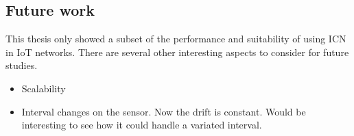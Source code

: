 \subsection{Future work}
This thesis only showed a subset of the performance and suitability of using ICN in IoT networks. There are several other interesting aspects to consider for future studies. 


\begin{itemize}
\item Scalability
\end{itemize}
\begin{itemize}
\item Interval changes on the sensor. Now the drift is constant. Would be interesting to see how it could handle a variated interval.
\end{itemize}

